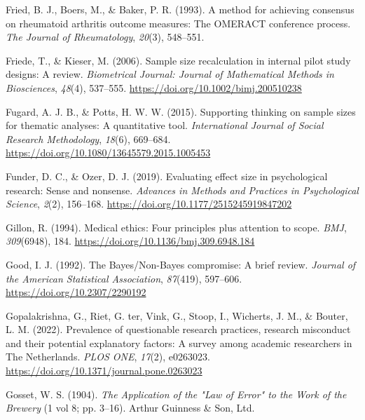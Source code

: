 \documentclass[
  letterpaper,
  DIV=11,
  numbers=noendperiod]{scrreprt}
\newlength{\cslhangindent}
\newlength{\cslentryspacingunit} %
\newenvironment{CSLReferences}[2] %
 {%
  \setlength{\parindent}{0pt}
  \ifodd #1
  \let\oldpar\par
  \def\par{\hangindent=\cslhangindent\oldpar}
  \fi
  \setlength{\parskip}{#2\cslentryspacingunit}
 }%
 {}
\begin{document}
\begin{CSLReferences}{1}{0}
\leavevmode{}%
Fried, B. J., Boers, M., \& Baker, P. R. (1993). A method for achieving
consensus on rheumatoid arthritis outcome measures: The {OMERACT}
conference process. \emph{The Journal of Rheumatology}, \emph{20}(3),
548--551.

\leavevmode{}%
Friede, T., \& Kieser, M. (2006). Sample size recalculation in internal
pilot study designs: A review. \emph{Biometrical Journal: Journal of
Mathematical Methods in Biosciences}, \emph{48}(4), 537--555.
\url{https://doi.org/10.1002/bimj.200510238}

\leavevmode{}%
Fugard, A. J. B., \& Potts, H. W. W. (2015). Supporting thinking on
sample sizes for thematic analyses: A quantitative tool.
\emph{International Journal of Social Research Methodology},
\emph{18}(6), 669--684.
\url{https://doi.org/10.1080/13645579.2015.1005453}

\leavevmode{}%
Funder, D. C., \& Ozer, D. J. (2019). Evaluating effect size in
psychological research: {Sense} and nonsense. \emph{Advances in Methods
and Practices in Psychological Science}, \emph{2}(2), 156--168.
\url{https://doi.org/10.1177/2515245919847202}

\leavevmode{}%
Gillon, R. (1994). Medical ethics: Four principles plus attention to
scope. \emph{BMJ}, \emph{309}(6948), 184.
\url{https://doi.org/10.1136/bmj.309.6948.184}

\leavevmode{}%
Good, I. J. (1992). The {Bayes}/{Non-Bayes} compromise: {A} brief
review. \emph{Journal of the American Statistical Association},
\emph{87}(419), 597--606. \url{https://doi.org/10.2307/2290192}

\leavevmode{}%
Gopalakrishna, G., Riet, G. ter, Vink, G., Stoop, I., Wicherts, J. M.,
\& Bouter, L. M. (2022). Prevalence of questionable research practices,
research misconduct and their potential explanatory factors: {A} survey
among academic researchers in {The Netherlands}. \emph{PLOS ONE},
\emph{17}(2), e0263023.
\url{https://doi.org/10.1371/journal.pone.0263023}

\leavevmode{}%
Gosset, W. S. (1904). \emph{The {Application} of the "{Law} of {Error}"
to the {Work} of the {Brewery}} (1 vol 8; pp. 3--16). {Arthur Guinness
\& Son, Ltd.}


\end{CSLReferences}
\end{document}
